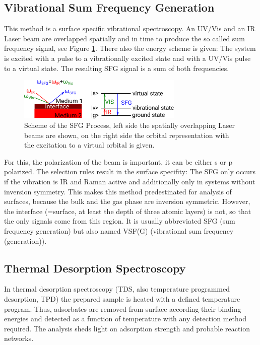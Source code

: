 \documentclass[11pt,DIV=13,BCOR=5mm,a4paper,headinclude]{scrbook}
\begin{document}
\subsection{Vibrational Sum Frequency Generation}
This method is a surface specific vibrational spectroscopy.
An UV/Vis and an IR Laser beam are overlapped spatially and in time to produce the so called sum frequency signal, see Figure \ref{abb:sfg_scheme}.
There also the energy scheme is given: The system is excited with a pulse to a vibrationally excited state and with a UV/Vis pulse to a virtual state.
The resulting SFG signal is a sum of both frequencies.
\begin{figure}[!h]
\centering
 \includegraphics[width=0.7\textwidth]{figures/theory/sfg-scheme.pdf}
   \caption{Scheme of the SFG Process, left side the spatially overlapping Laser beams are shown, on the right side the orbital representation with the excitation to a virtual orbital is given.}
            \label{abb:sfg_scheme}
\end{figure}
For this, the polarization of the beam is important, it can be either s or p polarized.
The selection rules result in the surface specifity: The SFG only occurs if the vibration is IR and Raman active and additionally only in systems without inversion symmetry.
This makes this method predestinated for analysis of surfaces, because the bulk and the gas phase are inversion symmetric.
However, the interface (=surface, at least the depth of three atomic layers) is not, so that the only signals come from this region.
It is usually abbreviated SFG (sum frequency generation) but also named VSF(G) (vibrational sum frequency (generation)).
 
\subsection{Thermal Desorption Spectroscopy}
In thermal desorption spectroscopy (TDS, also temperature programmed desorption, TPD) the prepared sample is heated with a defined temperature program.
Thus, adsorbates are removed from surface according their binding energies and detected as a function of temperature with any detection method required.
The analysis sheds light on adsorption strength and probable reaction networks.
\end{document}
